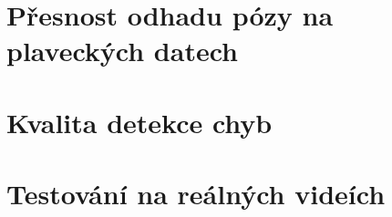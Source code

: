 
\section{Přesnost odhadu pózy na plaveckých datech}
\label{sec:presnost_pe}



\section{Kvalita detekce chyb}
\label{sec:kvalita_detekce}


%
%

\section{Testování na reálných videích}
\label{sec:realna_videa}



